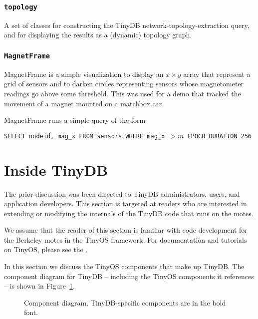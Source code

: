 \documentclass[11pt]{article}
\begin{document}
\subsubsection{\tt topology}
\label{sec:topology}
A set of classes for constructing the TinyDB
  network-topology-extraction query, and for displaying the results as
  a (dynamic) topology graph.

\subsubsection{\tt MagnetFrame}
\label{sec:magnetframe}
MagnetFrame is a simple visualization to
    display an $x \times y$ array that represent a grid of sensors and
    to darken circles representing sensors whose magnetometer readings
    go above some threshold.  This was used for a demo that tracked
    the movement of a magnet mounted on a matchbox car.
    
    MagnetFrame runs a simple query of the form
    
    {\tt SELECT nodeid, mag\_x FROM sensors WHERE mag\_x $> m$
    EPOCH DURATION 256}


\section{Inside TinyDB} \label{sec:inside}
The prior discussion was been directed to TinyDB administrators,
users, and application developers.  This section is targeted at
readers who are interested in extending or modifying the internals of
the TinyDB code that runs on the motes.

We assume that the reader of this section is familiar with code
development for the Berkeley motes in the
TinyOS framework.  For documentation and tutorials on
TinyOS, please see the .

In this section we discuss the TinyOS components that
make up TinyDB.  The component diagram for TinyDB --
including the TinyOS components it references -- is shown in
Figure~\ref{fig:components}.

\begin{figure}[ht]
\caption{Component diagram.  TinyDB-specific components are in the
  bold font.}
\label{fig:components}
\end{figure}
\end{document}

